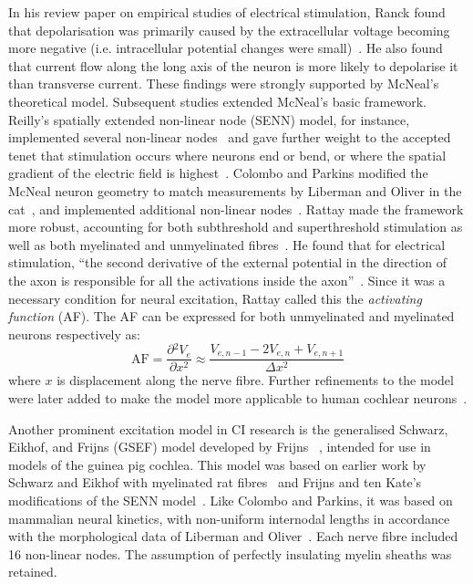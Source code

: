 In his review paper on empirical studies of electrical stimulation, Ranck found
that depolarisation was primarily caused by the extracellular voltage becoming
more negative (i.e. intracellular potential changes were
small)~\cite{ranck1975}. He also found that current flow along the long axis of
the neuron is more likely to depolarise it than transverse current. These
findings were strongly supported by McNeal's theoretical model. Subsequent
studies extended McNeal's basic framework. Reilly's spatially extended
non-linear node (SENN) model, for instance, implemented several non-linear
nodes~\cite{reilly1985} and gave further weight to the accepted tenet that
stimulation occurs where neurons end or bend, or where the spatial gradient of
the electric field is highest~\cite{reilly1998}. Colombo and Parkins modified
the McNeal neuron geometry to match measurements by Liberman and Oliver in the
cat~\cite{liberman1984}, and implemented additional non-linear
nodes~\cite{colombo1987}. Rattay made the framework more robust, accounting for
both subthreshold and superthreshold stimulation as well as both myelinated and
unmyelinated fibres~\cite{rattay1986}. He found that for electrical stimulation,
``the second derivative of the external potential in the direction of the axon
is responsible for all the activations inside the axon''~\cite{rattay1986}.
Since it was a necessary condition for neural excitation, Rattay called this the
\emph{activating function} (AF). The AF can be expressed for both unmyelinated
and myelinated neurons respectively as:
\begin{equation}
	\text{AF} = \frac{\partial {^2} V_e}{\partial x^2} \approx
	\frac{V_{e,n-1}-2V_{e,n}+V_{e,n+1}}{\Delta x^2}
	\label{eqn:af}
\end{equation}
where $ x $ is displacement along the nerve fibre. Further refinements to the
model were later added to make the model more applicable to human cochlear
neurons~\cite{rattay1999,rattay2001neuron}.

Another prominent excitation model in CI research is the generalised Schwarz,
Eikhof, and Frijns (GSEF) model developed by Frijns \etal~\cite{frijns1995},
intended for use in models of the guinea pig cochlea. This model was based on
earlier work by Schwarz and Eikhof with myelinated rat fibres~\cite{schwarz1987}
and Frijns and ten Kate's modifications of the SENN model~\cite{frijns1994}.
Like Colombo and Parkins, it was based on mammalian neural kinetics, with
non-uniform internodal lengths in accordance with the morphological data of
Liberman and Oliver~\cite{liberman1984}. Each nerve fibre included 16 non-linear
nodes. The assumption of perfectly insulating myelin sheaths was retained.

